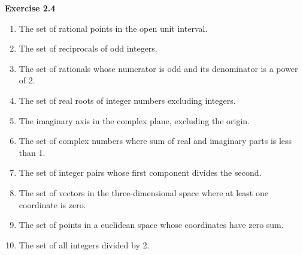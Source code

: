 \documentclass{article}
\begin{document}
\textbf{\large\color{blue} Exercise 2.4}
	\begin{enumerate}
		\item 
		The set of rational points in the open unit interval.
		\item 
		The set of reciprocals of odd integers.
		\item 
		The set of rationals whose numerator is odd and its denominator is a power of 2.
		\item 
		The set of real roots of integer numbers excluding integers.
		\item 
		The imaginary axis in the complex plane, excluding the origin.
		\item 
		The set of complex numbers where sum of real and imaginary parts is less than 1.
		\item 
		The set of integer pairs whose first component divides the second.
		\item 
		The set of vectors in the three-dimensional space where at least one coordinate is zero.
		\item 
		The set of points in a euclidean space whose coordinates have zero sum.
		\item 
		The set of all integers divided by 2.
	\end{enumerate}
\end{document}
